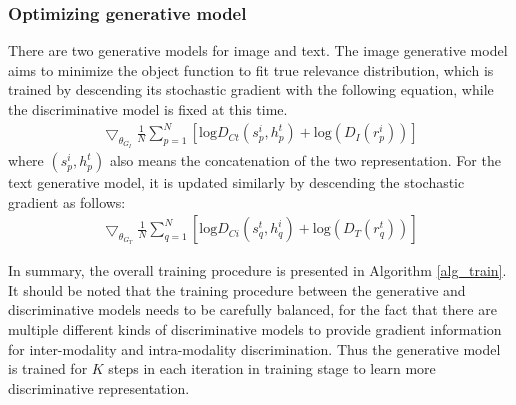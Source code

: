\documentclass[journal]{IEEEtran}
\begin{document}
\subsubsection{\textbf{Optimizing generative model}}

There are two generative models for image and text. The image generative model aims to minimize the object function to fit true relevance distribution, which is trained by descending its stochastic gradient with the following equation, while the discriminative model is fixed at this time.
\begin{align}
\bigtriangledown _{\theta_{G_I}}\frac{1}{N} \sum_{p=1}^{N}[\textrm{log}D_{Ct}(s_p^i,h_p^t)+\textrm{log}(D_I(r_p^i))]
\label{equ_gradient_gi}
\end{align}
where $(s_p^i,h_p^t)$ also means the concatenation of the two representation. For the text generative model, it is updated similarly by descending the stochastic gradient as follows:
\begin{align}
\bigtriangledown _{\theta_{G_T}}\frac{1}{N} \sum_{q=1}^{N}[\textrm{log}D_{Ci}(s_q^t,h_q^i)+\textrm{log}(D_T(r_q^t))]
\label{equ_gradient_gt}
\end{align}

In summary, the overall training procedure is presented in Algorithm \ref{alg_train}. It should be noted that the training procedure between the generative and discriminative models needs to be carefully balanced, for the fact that there are multiple different kinds of discriminative models to provide gradient information for inter-modality and intra-modality discrimination. Thus the generative model is trained for $K$ steps in each iteration in training stage to learn more discriminative representation. 
\end{document}
